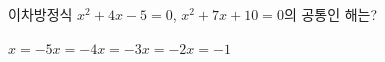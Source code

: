 이차방정식 $x^2+4x-5=0$, $x^2+7x+10=0$의 공통인 해는?
\begin{choices32}{$x=-5$}{$x=-4$}{$x=-3$}{$x=-2$}{$x=-1$}\end{choices32}
